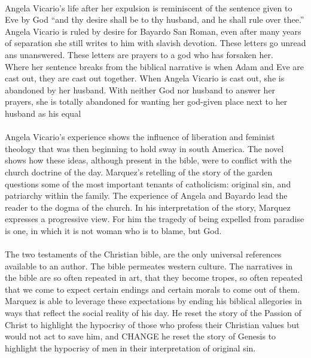 \documentclass[11pt,a4wide]{article}
\begin{document}
\paragraph{} Angela Vicario's life after her expulsion is reminiscent of the 
sentence given to Eve by God ``and thy desire shall be to thy husband, and he 
shall rule over thee.\cite[Genesis 3:16]{bible}'' Angela Vicario is ruled by 
desire for Bayardo San Roman, even after many years of separation she still 
writes to him with slavish devotion. These letters go unread ans unanswered. 
These letters are prayers to a god who has forsaken her.\\
Where her sentence breaks from the biblical narrative is when Adam and Eve
are cast out, they are cast out together. When Angela Vicario is cast out, she 
is abandoned by her husband. With neither God nor husband to answer her prayers,
she is totally abandoned for wanting her god-given place next to her husband as
his equal

\paragraph{} Angela Vicario's experience shows the influence of liberation and feminist 
theology that was then beginning to hold sway in south America. \cite{lib-theo} The novel
shows how these ideas, although present in the bible, were to conflict
with the church doctrine of the day.
Marquez's retelling of the story of the garden questions some of the most 
important tenants of catholicism: original sin, and patriarchy within the 
family. The experience of Angela and Bayardo lead the reader to the dogma
of the church. In his interpretation of the story, Marquez expresses 
a progressive view. For him the tragedy of being expelled from paradise
is one, in which it is not woman who is to blame, but God.

\paragraph{} The two testaments of the Christian bible, are the only universal 
references available to an author. The bible permeates
western culture. The narratives in the bible are so often repeated in art, that 
they become tropes, so often repeated that we come to expect certain endings and 
certain morals to come out of them.  Marquez is able to leverage these 
expectations by ending his biblical allegories in ways that reflect the social 
reality of his day. He reset the story of the Passion of Christ to highlight the 
hypocrisy of those who profess their Christian values but would not act to save 
him, and CHANGE
he reset the story of Genesis to highlight the hypocrisy of men in their 
interpretation of original sin.
\end{document}
